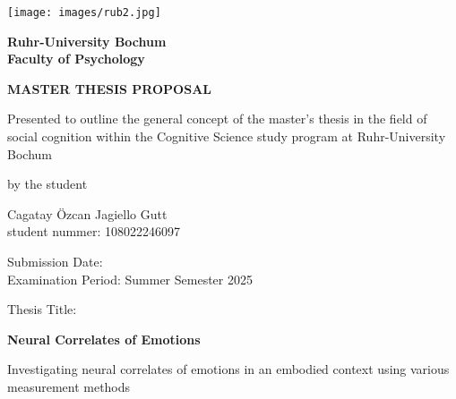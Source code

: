 \documentclass[12pt, titlepage]{article}
\begin{document}
    \begin{titlepage}
        \begin{center}
            \begin{minipage}{0.2\textwidth}
                \texttt{[image: images/rub2.jpg]}  %
            \end{minipage}
            \hspace*{\fill}
            \begin{minipage}{0.6\textwidth}
                \hspace*{\fill}\textbf{Ruhr-University Bochum} \\ \hspace*{\fill}\textbf{Faculty of Psychology}
            \end{minipage}
            
            \vspace{2 cm}
            {\textbf{\large MASTER THESIS PROPOSAL}}
            
            \vspace{0.2cm}
            Presented to outline the general concept of the master's thesis in the field of social cognition within the Cognitive Science study program at Ruhr-University Bochum
            
            \vspace{0.5cm}
            by the student
            
            \vspace{0.5cm}
            Cagatay Özcan Jagiello Gutt\\
            student nummer: 108022246097
            
            \vspace{0.5cm}
            Submission Date: \\
            Examination Period: Summer Semester 2025
            
            \vspace{0.5cm}
            Thesis Title:
            
            \vspace{0.2cm}
            \textbf{Neural Correlates of Emotions}
            
            \vspace{0.2cm}
            Investigating neural correlates of emotions in an embodied context using various measurement methods
            

\end{center}
\end{titlepage}
\end{document}
